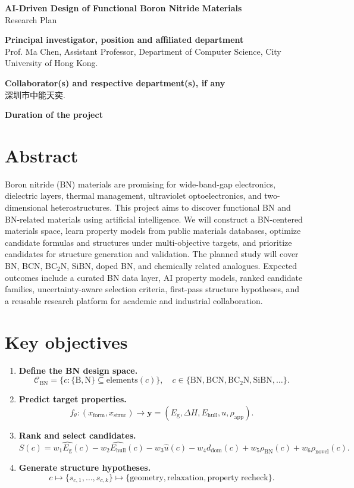 \documentclass[10pt]{article}
\newcommand{\blank}[1][8em]{\colorbox{yellow!35}{\rule{0pt}{1.1em}\hspace{#1}}}
\newcommand{\eg}{E_{\mathrm{g}}}
\newcommand{\ehull}{E_{\mathrm{hull}}}
\newcommand{\form}{x_{\mathrm{form}}}
\newcommand{\struc}{x_{\mathrm{struc}}}
\newcommand{\unc}{u}
\newcommand{\domain}{d_{\mathrm{dom}}}
\begin{document}
\begin{center}
{\Large \textbf{AI-Driven Design of Functional Boron Nitride Materials}}\\
{\normalsize Research Plan}
\end{center}

\textbf{Principal investigator, position and affiliated department}\\
Prof. Ma Chen, Assistant Professor, Department of Computer Science, City University of Hong Kong.

\textbf{Collaborator(s) and respective department(s), if any}\\
{\zhfont 深圳市中能天奕}.

\textbf{Duration of the project}\\
\blank[18em]

\section*{Abstract}
Boron nitride (BN) materials are promising for wide-band-gap electronics, dielectric layers, thermal management, ultraviolet optoelectronics, and two-dimensional heterostructures. This project aims to discover functional BN and BN-related materials using artificial intelligence. We will construct a BN-centered materials space, learn property models from public materials databases, optimize candidate formulas and structures under multi-objective targets, and prioritize candidates for structure generation and validation. The planned study will cover BN, BCN, BC$_2$N, SiBN, doped BN, and chemically related analogues. Expected outcomes include a curated BN data layer, AI property models, ranked candidate families, uncertainty-aware selection criteria, first-pass structure hypotheses, and a reusable research platform for academic and industrial collaboration.

\section*{Key objectives}
\begin{enumerate}
  \item \textbf{Define the BN design space.}
  \[
    \mathcal{C}_{\mathrm{BN}}=\{c:\{\mathrm{B},\mathrm{N}\}\subseteq
    \mathrm{elements}(c)\},\quad
    c\in\{\mathrm{BN},\mathrm{BCN},\mathrm{BC_2N},\mathrm{SiBN},\ldots\}.
  \]
  \item \textbf{Predict target properties.}
  \[
    f_{\theta}:(\form,\struc)\rightarrow
    \mathbf{y}=(\eg,\Delta H,\ehull,\unc,\rho_{\mathrm{app}}).
  \]
  \item \textbf{Rank and select candidates.}
  \[
    S(c)=w_1\hat{\eg}(c)-w_2\hat{\ehull}(c)-w_3\hat{\unc}(c)
    -w_4\domain(c)+w_5\rho_{\mathrm{BN}}(c)+w_6\rho_{\mathrm{novel}}(c).
  \]
  \item \textbf{Generate structure hypotheses.}
  \[
    c \mapsto \{s_{c,1},\ldots,s_{c,k}\}
    \mapsto \{\mathrm{geometry},\mathrm{relaxation},\mathrm{property\;recheck}\}.
  \]
\end{enumerate}
\end{document}
